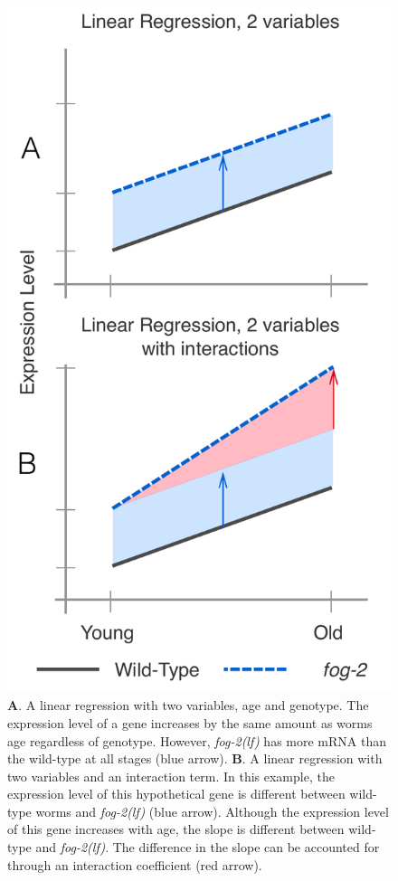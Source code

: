 \documentclass[10pt,letterpaper,twocolumn]{article}
\newcommand{\fog}{\emph{\mbox{fog-2(lf)}}}
\begin{document}
\begin{figure}[htbp]
\renewcommand{\familydefault}{\sfdefault}\normalfont{}
\centering
\includegraphics[width=\linewidth]{../../output/figs/final_figs/linear_regression.pdf}
\caption{
\textbf{A}. A linear regression with two variables, age and genotype.
The expression level of a gene increases by the same amount as worms age
regardless of genotype. However, \fog{} has more mRNA than the wild-type at all
stages (blue arrow).
\textbf{B}. A linear regression with two variables and an
interaction term. In this example, the expression level of this hypothetical
gene is different between wild-type worms and \fog{} (blue arrow). Although the
expression level of this gene increases with age, the slope is different between
wild-type and \fog{}. The difference in the slope can be accounted for through
an interaction coefficient (red arrow).
}
\label{fig:linear_reg}
\end{figure}
\end{document}
